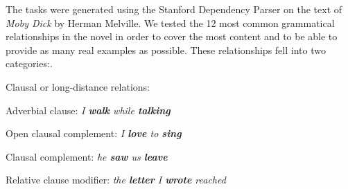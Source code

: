 The tasks were generated using the Stanford Dependency Parser \cite{de2006generating} on the text of \emph{Moby Dick} by Herman Melville. We tested the 12 most common grammatical relationships in the novel in order to cover the most content and to be able to provide as many real examples as possible. These relationships fell into two categories:.













Clausal or long-distance relations:
\squishlist
	\item {} Adverbial clause: \emph{ I \textbf{walk} while \textbf{talking}}
	\item  {} Open clausal complement:  \emph{I \textbf{love} to \textbf{sing} }
	\item  {} Clausal complement:  \emph{ he \textbf{saw} us \textbf{leave}}
	\item  {} Relative clause modifier:  \emph{the \textbf{letter} I \textbf{wrote} reached }
\squishend

